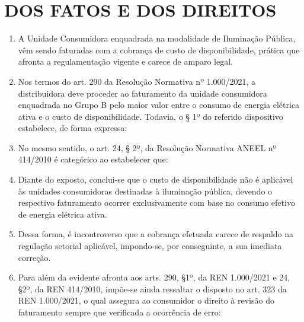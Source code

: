 \newcommand{\tipoRequerimento}{custo de disponibilidade}

\section{DOS FATOS E DOS DIREITOS}

\begin{enumerate}[resume]
\item A Unidade Consumidora \unidadeConsumidora{} enquadrada na modalidade de Iluminação Pública, vêm sendo faturadas com a cobrança de custo de disponibilidade, prática que afronta a regulamentação vigente e carece de amparo legal.
\item Nos termos do art. 290 da Resolução Normativa nº 1.000/2021, a distribuidora deve proceder ao faturamento da unidade consumidora enquadrada no Grupo B pelo maior valor entre o consumo de energia elétrica ativa e o custo de disponibilidade. Todavia, o § 1º do referido dispositivo estabelece, de forma expressa:
\item No mesmo sentido, o art. 24, § 2º, da Resolução Normativa ANEEL nº 414/2010 é categórico ao estabelecer que:
\
\item Diante do exposto, conclui-se que o custo de disponibilidade não é aplicável às unidades consumidoras destinadas à iluminação pública, devendo o respectivo faturamento ocorrer exclusivamente com base no consumo efetivo de energia elétrica ativa.
\item Dessa forma, é incontroverso que a cobrança efetuada carece de respaldo na regulação setorial aplicável, impondo-se, por conseguinte, a sua imediata correção.
\item Para além da evidente afronta aos arts. 290, §1º, da REN 1.000/2021 e 24, §2º, da REN 414/2010, impõe-se ainda ressaltar o disposto no art. 323 da REN 1.000/2021, o qual assegura ao consumidor o direito à revisão do faturamento sempre que verificada a ocorrência de erro:
\end{enumerate}
